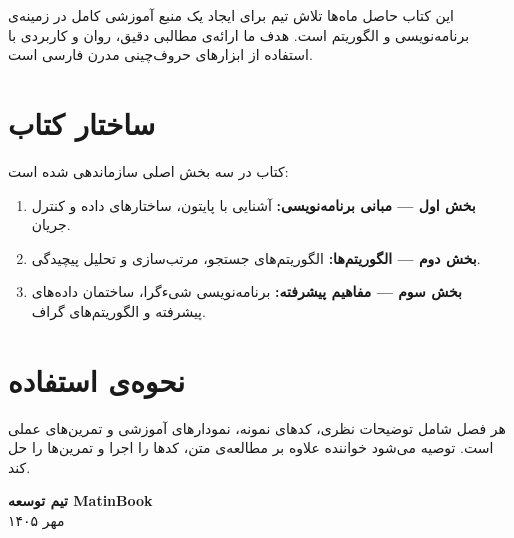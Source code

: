 \documentclass{matinbook}
\begin{document}
این کتاب حاصل ماه‌ها تلاش تیم  برای ایجاد
یک منبع آموزشی کامل در زمینه‌ی برنامه‌نویسی و الگوریتم
است. هدف ما ارائه‌ی مطالبی دقیق، روان و کاربردی با
استفاده از ابزارهای حروف‌چینی مدرن فارسی است.

\section*{ساختار کتاب}

کتاب در سه بخش اصلی سازماندهی شده است:

\begin{enumerate}
    \item \textbf{بخش اول — مبانی برنامه‌نویسی:}
    آشنایی با پایتون، ساختارهای داده و کنترل جریان.
    \item \textbf{بخش دوم — الگوریتم‌ها:}
    الگوریتم‌های جستجو، مرتب‌سازی و تحلیل پیچیدگی.
    \item \textbf{بخش سوم — مفاهیم پیشرفته:}
    برنامه‌نویسی شیءگرا، ساختمان داده‌های پیشرفته و
    الگوریتم‌های گراف.
\end{enumerate}

\section*{نحوه‌ی استفاده}

هر فصل شامل توضیحات نظری، کدهای نمونه، نمودارهای
آموزشی و تمرین‌های عملی است. توصیه می‌شود خواننده
علاوه بر مطالعه‌ی متن، کدها را اجرا و تمرین‌ها را
حل کند.

\vspace{1cm}
\begin{flushleft}
    \textbf{تیم توسعه MatinBook} \\
    مهر ۱۴۰۵
\end{flushleft}

\clearpage

\tableofcontents
\clearpage

\listoffigures
\clearpage

\listoftables
\clearpage

\listofalgorithms
\clearpage

\mainmatter
\mainmattergeometry

\end{document}
